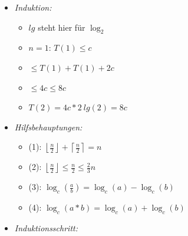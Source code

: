 \documentclass[
    12pt,
    a4paper,
    ngerman,
    color=3b,%
    marginpar=false,
    colorback=false,
    leqno,
]{tudaexercise}
\begin{document}
\begin{itemize}
\begin{itemize}
\begin{itemize}
                        \item \textit{Induktion:}
                              \begin{itemize}
                                  \item $lg$ steht hier für $\log_2$
                                  \item $n = 1$: $T(1) \leq c$
                                  \item {}  $\leq T(1) + T(1) +2c$
                                  \item[] {\makebox[2cm][l]{}} $\leq 4c \leq 8c$
                                  \item[] {\makebox[1cm][l]{}} $T(2) = 4c * 2~lg(2) = 8c$
                              \end{itemize}
                        \item \textit{Hilfsbehauptungen:}
                              \begin{itemize}
                                  \item (1): $\left \lfloor \frac{n}{2} \right \rfloor + \left \lceil \frac{n}{2} \right \rceil = n$
                                  \item (2): $\left \lfloor \frac{n}{2} \right \rfloor \leq \frac{n}{2} \leq \frac{2}{3}n$
                                  \item (3): $\log_c(\frac{a}{b}) = \log_c(a) - \log_c(b)$
                                  \item (4): $\log_c(a*b) = \log_c(a) + \log_c(b)$
                              \end{itemize}
                        \item \textit{Induktionsschritt:}
\end{itemize}
\end{itemize}
\end{itemize}
\end{document}
